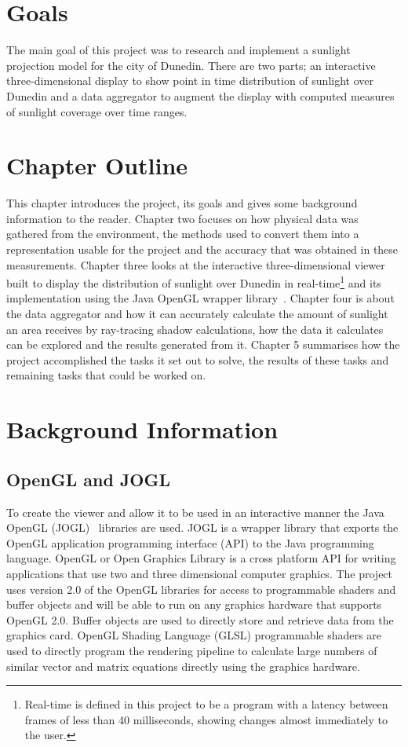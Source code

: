 \documentclass[12pt]{report}
\begin{document}
\section{Goals}
The main goal of this project was to research and implement a sunlight projection model for the city of Dunedin. There are two parts; an interactive three-dimensional display to show point in time distribution of sunlight over Dunedin and a data aggregator to augment the display with computed measures of sunlight coverage over time ranges.

\section{Chapter Outline}
This chapter introduces the project, its goals and gives some background information to the reader. Chapter two focuses on how physical data was gathered from the environment, the methods used to convert them into a representation usable for the project and the accuracy that was obtained in these measurements. Chapter three looks at the interactive three-dimensional viewer built to display the distribution of sunlight over Dunedin in real-time\footnote{Real-time is defined in this project to be a program with a latency between frames of less than 40 milliseconds, showing changes almost immediately to the user.} and its implementation using the Java OpenGL wrapper library~\cite{JOGL}. Chapter four is about the data aggregator and how it can accurately calculate the amount of sunlight an area receives by ray-tracing shadow calculations, how the data it calculates can be explored and the results generated from it. Chapter 5 summarises how the project accomplished the tasks it set out to solve, the results of these tasks and remaining tasks that could be worked on.

\section{Background Information}
\subsection{OpenGL and JOGL} 
To create the viewer and allow it to be used in an interactive manner the Java OpenGL (JOGL)~\cite{JOGL} libraries are used. JOGL is a wrapper library that exports the OpenGL application programming interface (API) to the Java programming language. OpenGL or Open Graphics Library is a cross platform API for writing applications that use two and three dimensional computer graphics. The project uses version 2.0 of the OpenGL libraries for access to programmable shaders and buffer objects and will be able to run on any graphics hardware that supports OpenGL 2.0. Buffer objects are used to directly store and retrieve data from the graphics card.
OpenGL Shading Language (GLSL) programmable shaders are used to directly program the rendering pipeline to calculate large numbers of similar vector and matrix equations directly using the graphics hardware.
\end{document}
